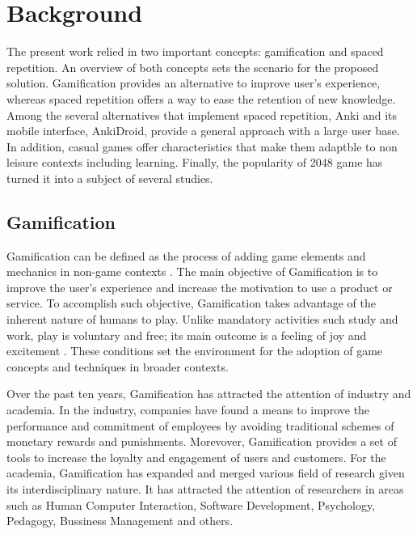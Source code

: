 
\chapter{Background} %

\label{back} %

The present work relied in two important concepts: gamification and spaced repetition. An overview of both concepts sets the scenario for the proposed solution. Gamification provides an alternative to improve user's experience, whereas spaced repetition offers a way to ease the retention of new knowledge. Among the several alternatives that implement spaced repetition, Anki and its mobile interface, AnkiDroid, provide a general approach with a large user base. In addition, casual games offer characteristics that make them adaptble to non leisure contexts including learning. Finally, the popularity of 2048 game has turned it into a subject of several studies.

\section{Gamification}
Gamification can be defined as the process of adding game elements and mechanics in non-game contexts \citep{deterding2011game}. The main objective of Gamification is to improve the user's experience and increase the motivation to use a product or service. To accomplish such objective, Gamification takes advantage of the inherent nature of humans to play. Unlike mandatory activities such study and work, play is voluntary and free; its main outcome is a feeling of joy and excitement \citep{johan1950homo}. These conditions set the environment for the adoption of game concepts and techniques in broader contexts.

Over the past ten years, Gamification has attracted the attention of industry and academia. In the industry, companies have found a means to improve the performance and commitment of employees by avoiding traditional schemes of monetary rewards and punishments. Morevover, Gamification provides a set of tools to increase the loyalty and engagement of users and customers. For the academia, Gamification has expanded and merged various field of research given its interdisciplinary nature. It has attracted the attention of researchers in areas such as Human Computer Interaction, Software Development, Psychology, Pedagogy, Bussiness Management and others.

